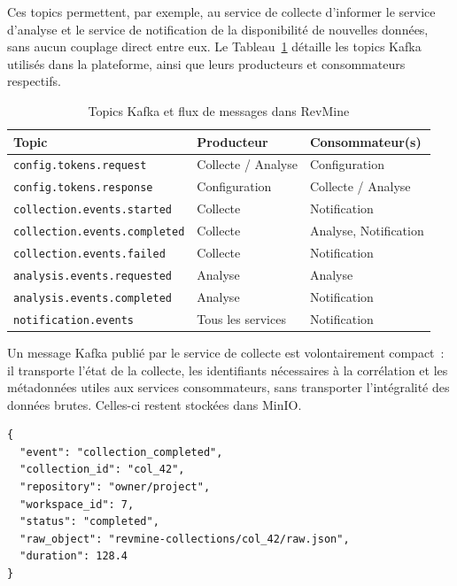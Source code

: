 Ces topics permettent, par exemple, au service de collecte d'informer le service d'analyse et
le service de notification de la disponibilité de nouvelles données, sans aucun couplage direct
entre eux. Le Tableau~\ref{tab:kafka-topics} détaille les topics Kafka utilisés dans la
plateforme, ainsi que leurs producteurs et consommateurs respectifs.

\begin{table}[H]
\centering
\small
\caption{Topics Kafka et flux de messages dans RevMine}
\label{tab:kafka-topics}
\begin{tabular}{|>{\raggedright\arraybackslash}p{6.2cm}
                |>{\raggedright\arraybackslash}p{3cm}
                |>{\raggedright\arraybackslash}p{3.5cm}|}
\hline
\textbf{Topic} & \textbf{Producteur} & \textbf{Consommateur(s)} \\
\hline
\texttt{config.tokens.request} & Collecte / Analyse & Configuration \\
\hline
\texttt{config.tokens.response} & Configuration & Collecte / Analyse \\
\hline
\texttt{collection.events.started} & Collecte & Notification \\
\hline
\texttt{collection.events.completed} & Collecte & Analyse, Notification \\
\hline
\texttt{collection.events.failed} & Collecte & Notification \\
\hline
\texttt{analysis.events.requested} & Analyse & Analyse \\
\hline
\texttt{analysis.events.completed} & Analyse & Notification \\
\hline
\texttt{notification.events} & Tous les services & Notification \\
\hline
\end{tabular}
\end{table}

Un message Kafka publié par le service de collecte est volontairement compact~: il transporte
l'état de la collecte, les identifiants nécessaires à la corrélation et les métadonnées utiles aux
services consommateurs, sans transporter l'intégralité des données brutes. Celles-ci restent
stockées dans MinIO.

\begin{verbatim}
{
  "event": "collection_completed",
  "collection_id": "col_42",
  "repository": "owner/project",
  "workspace_id": 7,
  "status": "completed",
  "raw_object": "revmine-collections/col_42/raw.json",
  "duration": 128.4
}
\end{verbatim}

